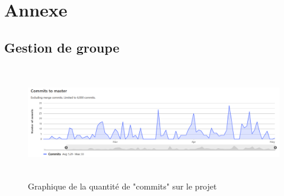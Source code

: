 \documentclass[12pt]{report}
\begin{document}
		\chapter{Annexe}

	    
	    \section {Gestion de groupe}
	     \begin{figure}[!h]
			\centering
				\includegraphics[height=5cm]{figures/bdd-rapport-5.PNG}
			\caption{Graphique de la quantité de "commits" sur le projet}
		\end{figure}
	    \hypertarget{annexe-gestion}{}
\end{document}
